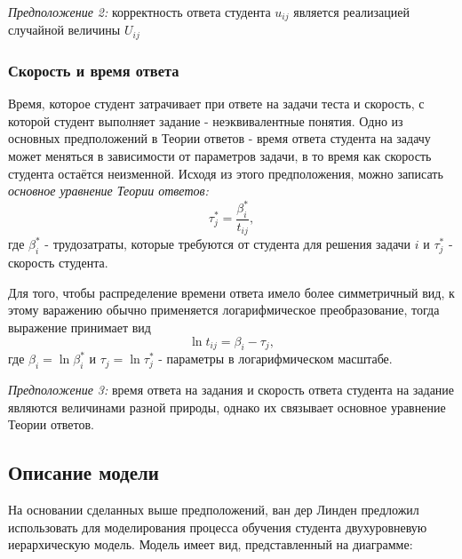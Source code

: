 {\itshape Предположение 2:} корректность ответа студента $u_{ij}$ является реализацией случайной величины $U_{ij}$

\subsubsection{Скорость и время ответа}

Время, которое студент затрачивает при ответе на задачи теста и  скорость, с которой студент выполняет задание - неэквивалентные понятия. Одно из основных предположений в  Теории ответов - время ответа студента на задачу может меняться в зависимости от параметров задачи, в то время как скорость студента остаётся неизменной. Исходя из этого предположения, можно за\-писать {\itshape основное уравнение Теории ответов:}
\begin{equation}
\tau_{j}^{*} = \frac{\beta^{*}_{i}}{t_{ij}},
\end{equation}
где $\beta^{*}_{i}$ - трудозатраты, которые требуются от студента для решения задачи $i$ и $\tau_{j}^{*}$ - скорость студента.

Для того, чтобы распределение времени ответа имело более симметричный вид, к этому варажению обычно применяется лога\-рифмическое преобразо\-вание, тогда выражение при\-нимает вид
\begin{equation}
\ln {t_{ij}} = \beta_{i} - \tau_{j},
\end{equation}
где $\beta_{i} = \ln \beta^{*}_{i}$ и $\tau_{j} = \ln \tau^{*}_{j}$ - параметры в логарифмическом масштабе.

{\itshape Предположение 3:} время ответа на задания и скорость ответа студента на задание являются величинами разной природы, однако их связывает основное уравнение Теории ответов.

\newpage
\subsection{Описание модели}

\label{detmodel} 

На основании сделанных выше предположений, ван дер Линден пред\-ложил использовать для моделирования процесса обучения студента двух\-уровневую иерархическую модель. Модель имеет вид, представленный на диаграмме:



